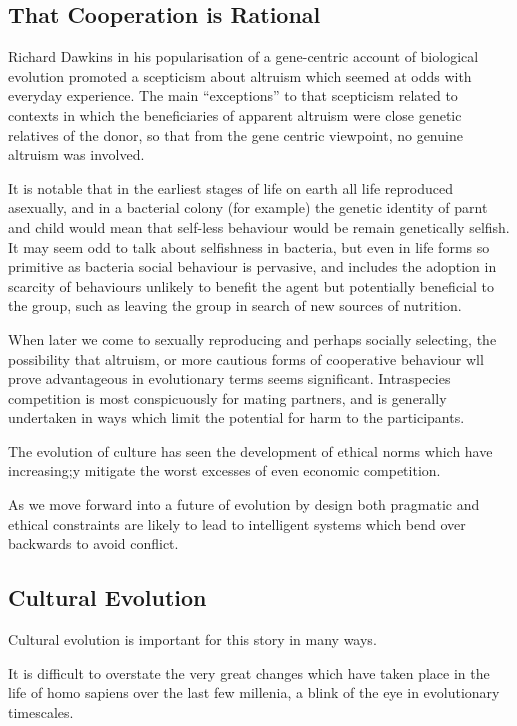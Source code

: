 \subsection{That Cooperation is Rational}

Richard Dawkins in his popularisation of a gene-centric account of biological evolution \cite{dawkinsSG} promoted a scepticism about altruism which seemed at odds with everyday experience.
The main ``exceptions'' to that scepticism related to contexts in which the beneficiaries of apparent altruism were close genetic relatives of the donor, so that from the gene centric viewpoint, no genuine altruism was involved.

It is notable that in the earliest stages of life on earth all life reproduced asexually, and in a bacterial colony (for example) the genetic identity of parnt and child would mean that self-less behaviour would be remain genetically selfish.
It may seem odd to talk about selfishness in bacteria, but even in life forms so primitive as bacteria social behaviour is pervasive, and includes the adoption in scarcity of behaviours unlikely to benefit the agent but potentially beneficial to the group, such as leaving the group in search of new sources of nutrition.

When later we come to sexually reproducing and perhaps socially selecting, the possibility that altruism, or more cautious forms of cooperative behaviour wll prove advantageous in evolutionary terms seems significant.
Intraspecies competition is most conspicuously for mating partners, and is generally undertaken in ways which limit the potential for harm to the participants.

The evolution of culture has seen the development of ethical norms which have increasing;y mitigate the worst excesses of even economic competition.

As we move forward into a future of evolution by design both pragmatic and ethical constraints are likely to lead to intelligent systems which bend over backwards to avoid conflict.

\subsection{Cultural Evolution}

Cultural evolution is important for this story in many ways.

It is difficult to overstate the very great changes which have taken place in the life of homo sapiens over the last few millenia, a blink of the eye in evolutionary timescales.

